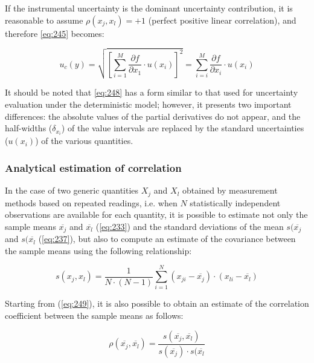 \documentclass[../main.tex]{subfiles}
\begin{document}
If the instrumental uncertainty is the dominant uncertainty contribution, it is reasonable to assume $\rho(x_j, x_l) = +1$ (perfect positive linear correlation), and therefore \autoref{eq:245} becomes:

\begin{equation}
	u_c(y) = \sqrt{\left[ \sum_{i=1}^M \frac{\partial f}{\partial x_1} \cdot u(x_i)  \right]^2} = \sum_{i=i}^M \frac{\partial f}{\partial x_i} \cdot u(x_i)
\label{eq:248}	
\end{equation}

It should be noted that \autoref{eq:248} has a form similar to that used for uncertainty evaluation under the deterministic model; however, it presents two important differences: the absolute values of the partial derivatives do not appear, and the half-widths ($\delta_{x_i}$) of the value intervals are replaced by the standard uncertainties ($u(x_i)$) of the various quantities.\\


\subsubsection*{Analytical estimation of correlation}

In the case of two generic quantities $X_j$ and $X_l$ obtained by measurement methods based on repeated readings, i.e. when $N$ statistically independent observations are available for each quantity, it is possible to estimate not only the sample means $\overline{x_j}$ and $\overline{x_l}$ (\autoref{eq:233}) and the standard deviations of the mean $s(\overline{x_j}$ and $s(\overline{x_l}$ (\autoref{eq:237}), but also to compute an estimate of the covariance between the sample means using the following relationship:

\begin{equation}
	s(x_j, x_l) = \frac{1}{N \cdot (N-1)} \sum_{i=1}^N \left( x_{ji} - \overline{x_j} \right) \cdot \left( x_{li} - \overline{x_l} \right)
\label{eq:249}	
\end{equation}

Starting from (\autoref{eq:249}), it is also possible to obtain an estimate of the correlation coefficient between the sample means as follows:

\begin{equation}
	\rho (\overline{x_j},\overline{x_l}) = \frac{s(\overline{x_j},\overline{x_l})}{s(\overline{x_j}) \cdot s(\overline{x_l}}
\end{equation}
\end{document}
